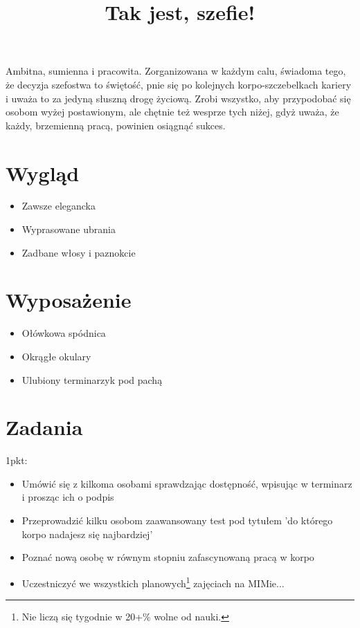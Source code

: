 \documentclass[11pt,a4paper,sans]{moderncv}        %
\title{Tak jest, szefie!}                               %
\begin{document}
\makecvtitle
Ambitna, sumienna i pracowita. Zorganizowana w każdym calu, świadoma tego, że decyzja szefostwa to świętość, pnie się
po kolejnych korpo-szczebelkach kariery i uważa to za jedyną słuszną drogę życiową. Zrobi wszystko, aby przypodobać
się osobom wyżej postawionym, ale chętnie też wesprze tych niżej, gdyż uważa, że każdy, brzemienną pracą, powinien
osiągnąć sukces.

\section{Wygląd}
\begin{itemize}
	\item Zawsze elegancka
	\item Wyprasowane ubrania
	\item Zadbane włosy i paznokcie
\end{itemize}

\section{Wyposażenie}
\begin{itemize}
	\item Ołówkowa spódnica
	\item Okrągłe okulary
	\item Ulubiony terminarzyk pod pachą
\end{itemize}

\section{Zadania}
1pkt:
\begin{itemize}
	\item Umówić się z kilkoma osobami sprawdzając dostępność, wpisując w terminarz i prosząc ich o podpis
	\item Przeprowadzić kilku osobom zaawansowany test pod tytułem 'do którego korpo nadajesz się najbardziej'
	\item Poznać nową osobę w równym stopniu zafascynowaną pracą w korpo
	\item Uczestniczyć we wszystkich planowych\footnote{Nie liczą się tygodnie w 20+\% wolne od nauki.} zajęciach na MIMie...
\end{itemize}
\newpage
\end{document}
